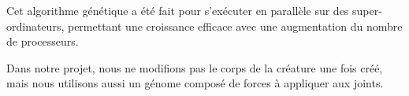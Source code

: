 \documentclass[journal, a4paper]{IEEEtran}
\begin{document}
Cet algorithme génétique a été fait pour s'exécuter en parallèle sur des super-ordinateurs, permettant une croissance efficace avec une augmentation du nombre de processeurs.

Dans notre projet, nous ne modifions pas le corps de la créature une fois créé, mais nous utilisons aussi un génome composé de forces à appliquer aux joints.






\end{document}
